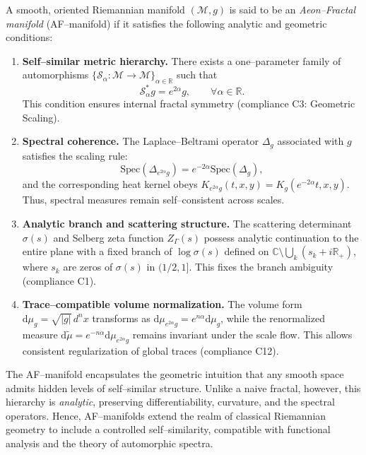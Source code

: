 \begin{definition}
\label{def:AFM}
A smooth, oriented Riemannian manifold \((\mathcal{M}, g)\)
is said to be an \emph{Aeon–Fractal manifold} (AF–manifold)
if it satisfies the following analytic and geometric conditions:

\begin{enumerate}[label=(AF\arabic*), leftmargin=3em]
    \item \textbf{Self–similar metric hierarchy.}
    There exists a one–parameter family of automorphisms
    \(\{\mathcal{S}_\alpha : \mathcal{M} \to \mathcal{M}\}_{\alpha \in \mathbb{R}}\)
    such that
    \[
    \mathcal{S}_\alpha^\ast g = e^{2\alpha} g,
    \qquad
    \forall \alpha \in \mathbb{R}.
    \]
    This condition ensures internal fractal symmetry
    (compliance C3: Geometric Scaling).

    \item \textbf{Spectral coherence.}
    The Laplace–Beltrami operator \(\Delta_g\)
    associated with \(g\)
    satisfies the scaling rule:
    \[
    \mathrm{Spec}(\Delta_{e^{2\alpha} g})
    = e^{-2\alpha}\mathrm{Spec}(\Delta_g),
    \]
    and the corresponding heat kernel obeys
    \(K_{e^{2\alpha}g}(t,x,y) = K_g(e^{-2\alpha}t,x,y)\).
    Thus, spectral measures remain self–consistent across scales.

    \item \textbf{Analytic branch and scattering structure.}
    The scattering determinant \(\sigma(s)\)
    and Selberg zeta function \(Z_\Gamma(s)\)
    possess analytic continuation to the entire plane
    with a fixed branch of \(\log\sigma(s)\)
    defined on
    \(\mathbb{C}\setminus \bigcup_{k} (s_k + i\mathbb{R}_+)\),
    where \(s_k\) are zeros of \(\sigma(s)\) in \((1/2,1]\).
    This fixes the branch ambiguity (compliance C1).

    \item \textbf{Trace–compatible volume normalization.}
    The volume form \(\mathrm{d}\mu_g = \sqrt{|g|}\,d^nx\)
    transforms as
    \(\mathrm{d}\mu_{e^{2\alpha}g} = e^{n\alpha}\mathrm{d}\mu_g\),
    while the renormalized measure
    \(\mathrm{d}\tilde{\mu} = e^{-n\alpha}\mathrm{d}\mu_{e^{2\alpha}g}\)
    remains invariant under the scale flow.
    This allows consistent regularization of global traces
    (compliance C12).
\end{enumerate}
\end{definition}

\begin{remark}
The AF–manifold encapsulates the geometric intuition
that any smooth space admits hidden levels of self–similar structure.
Unlike a naive fractal, however, this hierarchy is \emph{analytic},
preserving differentiability, curvature, and the spectral operators.
Hence, AF–manifolds extend the realm of classical Riemannian geometry
to include a controlled self–similarity,
compatible with functional analysis and the theory of automorphic spectra.
\end{remark}

